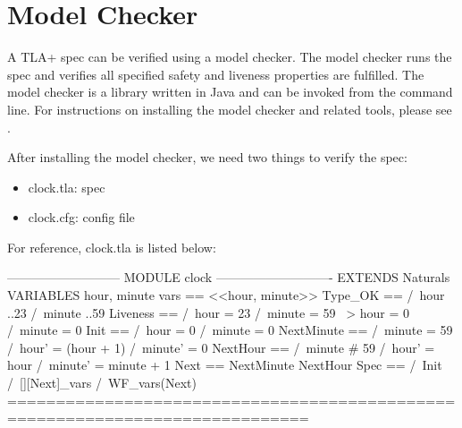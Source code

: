 \section{Model Checker}

A TLA+ spec can be verified using a model checker. The model checker runs the spec
and verifies all specified safety and liveness properties are fulfilled. The
model checker is a library written in Java and can be invoked from the command
line. For instructions on installing the model checker and related tools, please
see \cite{toolbox}.\newline

After installing the model checker, we need two things to verify the spec:
\begin{itemize}
    \item clock.tla: spec 
    \item clock.cfg: config file
\end{itemize}

For reference, clock.tla is listed below:\newline

\begin{tla}
--------------------------- MODULE clock ----------------------------
EXTENDS Naturals
VARIABLES hour, minute
vars == <<hour, minute>>
Type_OK == 
    /\ hour ..23
    /\ minute ..59
Liveness ==
    /\ hour = 23 /\ minute = 59 ~> hour = 0 /\ minute = 0
Init ==
    /\ hour = 0
    /\ minute = 0
NextMinute ==
    /\ minute = 59 
    /\ hour' = (hour + 1) %
    /\ minute' = 0
NextHour == 
    /\ minute # 59
    /\ hour' = hour 
    /\ minute' = minute + 1 
Next ==
    \/ NextMinute
    \/ NextHour
Spec ==
  /\ Init
  /\ [][Next]_vars
  /\ WF_vars(Next)
=============================================================================
\end{tla}
\begin{tlatex}
\@x{}\moduleLeftDash{}\moduleRightDash\@xx{}%
%
%
%
%
%
%
%
%
%
%
%
%
%
%
%
%
%
%
%
%
%
%
%
%
%
\@x{}\bottombar\@xx{}%
\end{tlatex}

